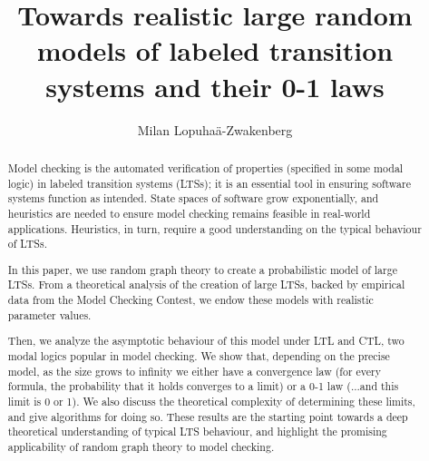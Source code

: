 \documentclass[runngingheads]{llncs}
\begin{document}
\title{Towards realistic large random models of labeled transition systems and their 0-1 laws} %




\author{Milan {Lopuha\"a-Zwakenberg}}




\maketitle              %
%
\begin{abstract}
Model checking is the automated verification of properties (specified in some modal logic) in labeled transition systems (LTSs); it is an essential tool in ensuring software systems function as intended. State spaces of software grow exponentially, and heuristics are needed to ensure model checking remains feasible in real-world applications. Heuristics, in turn, require a good understanding on the typical behaviour of LTSs.

In this paper, we use random graph theory to create a probabilistic model of large LTSs. From a theoretical analysis of the creation of large LTSs, backed by empirical data from the Model Checking Contest, we endow these models with realistic parameter values.

Then, we analyze the asymptotic behaviour of this model under LTL and CTL, two modal logics popular in model checking. We show that, depending on the precise model, as the size grows to infinity we either have a convergence law (for every formula, the probability that it holds converges to a limit) or a 0-1 law (...and this limit is 0 or 1). We also discuss the theoretical complexity of determining these limits, and give algorithms for doing so. These results are the starting point towards a deep theoretical understanding of typical LTS behaviour, and highlight the promising applicability of random graph theory to model checking.
\end{abstract}
%
%
\end{document}
